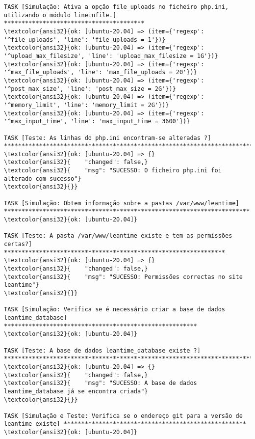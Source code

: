 \documentclass{scrartcl}
\begin{document}
\begin{Verbatim}
TASK [Simulação: Ativa a opção file_uploads no ficheiro php.ini, utilizando o módulo lineinfile.] ****************************************
\textcolor{ansi32}{ok: [ubuntu-20.04] => (item={'regexp': '^file_uploads', 'line': 'file_uploads = 1'})}
\textcolor{ansi32}{ok: [ubuntu-20.04] => (item={'regexp': '^upload_max_filesize', 'line': 'upload_max_filesize = 1G'})}
\textcolor{ansi32}{ok: [ubuntu-20.04] => (item={'regexp': '^max_file_uploads', 'line': 'max_file_uploads = 20'})}
\textcolor{ansi32}{ok: [ubuntu-20.04] => (item={'regexp': '^post_max_size', 'line': 'post_max_size = 2G'})}
\textcolor{ansi32}{ok: [ubuntu-20.04] => (item={'regexp': '^memory_limit', 'line': 'memory_limit = 2G'})}
\textcolor{ansi32}{ok: [ubuntu-20.04] => (item={'regexp': '^max_input_time', 'line': 'max_input_time = 3600'})}

TASK [Teste: As linhas do php.ini encontram-se alteradas ?] ******************************************************************************
\textcolor{ansi32}{ok: [ubuntu-20.04] => {}
\textcolor{ansi32}{    "changed": false,}
\textcolor{ansi32}{    "msg": "SUCESSO: O ficheiro php.ini foi alterado com sucesso"}
\textcolor{ansi32}{}}

TASK [Simulação: Obtem informação sobre a pastas /var/www/leantime] **********************************************************************
\textcolor{ansi32}{ok: [ubuntu-20.04]}

TASK [Teste: A pasta /var/www/leantime existe e tem as permissões certas?] ***************************************************************
\textcolor{ansi32}{ok: [ubuntu-20.04] => {}
\textcolor{ansi32}{    "changed": false,}
\textcolor{ansi32}{    "msg": "SUCESSO: Permissões correctas no site leantime"}
\textcolor{ansi32}{}}

TASK [Simulação: Verifica se é necessário criar a base de dados leantime_database] *******************************************************
\textcolor{ansi32}{ok: [ubuntu-20.04]}

TASK [Teste: A base de dados leantime_database existe ?] *********************************************************************************
\textcolor{ansi32}{ok: [ubuntu-20.04] => {}
\textcolor{ansi32}{    "changed": false,}
\textcolor{ansi32}{    "msg": "SUCESSO: A base de dados leantime_database já se encontra criada"}
\textcolor{ansi32}{}}

TASK [Simulação e Teste: Verifica se o endereço git para a versão de leantime existe] ****************************************************
\textcolor{ansi32}{ok: [ubuntu-20.04]}


\end{Verbatim}
\end{document}
